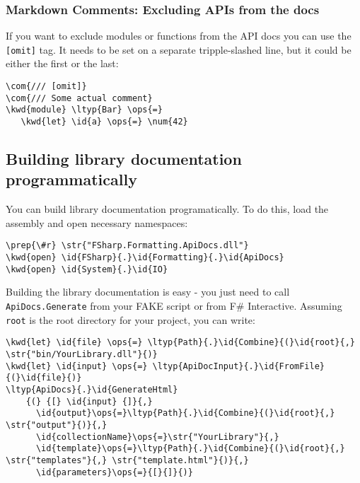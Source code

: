\documentclass{article}
\newcommand{\id}[1]{\textcolor{black}{#1}}
\newcommand{\com}[1]{\textcolor{officegreen}{#1}}
\newcommand{\kwd}[1]{\textcolor{navy}{#1}}
\newcommand{\num}[1]{\textcolor{officegreen}{#1}}
\newcommand{\ops}[1]{\textcolor{purple}{#1}}
\newcommand{\prep}[1]{\textcolor{purple}{#1}}
\newcommand{\str}[1]{\textcolor{olive}{#1}}
\begin{document}
\subsubsection*{Markdown Comments: Excluding APIs from the docs}



If you want to exclude modules or functions from the API docs you can use the \texttt{[omit]} tag.
It needs to be set on a separate tripple-slashed line, but it could be either the first or the last:
\begin{Verbatim}[commandchars=\\\{\}]
\com{/// [omit]}
\com{/// Some actual comment}
\kwd{module} \ltyp{Bar} \ops{=} 
   \kwd{let} \id{a} \ops{=} \num{42}
\end{Verbatim}

\subsection*{Building library documentation programmatically}



You can build library documentation programatically. To do this, load the assembly and open necessary namespaces:
\begin{Verbatim}[commandchars=\\\{\}]
\prep{\#r} \str{"FSharp.Formatting.ApiDocs.dll"}
\kwd{open} \id{FSharp}{.}\id{Formatting}{.}\id{ApiDocs}
\kwd{open} \id{System}{.}\id{IO}
\end{Verbatim}



Building the library documentation is easy - you just need to call
\texttt{ApiDocs.Generate} from your FAKE script or from F\# Interactive.
Assuming \texttt{root} is the root directory for your project, you can write:
\begin{Verbatim}[commandchars=\\\{\}]
\kwd{let} \id{file} \ops{=} \ltyp{Path}{.}\id{Combine}{(}\id{root}{,} \str{"bin/YourLibrary.dll"}{)}
\kwd{let} \id{input} \ops{=} \ltyp{ApiDocInput}{.}\id{FromFile}{(}\id{file}{)} 
\ltyp{ApiDocs}{.}\id{GenerateHtml}
    {(} {[} \id{input} {]}{,} 
      \id{output}\ops{=}\ltyp{Path}{.}\id{Combine}{(}\id{root}{,} \str{"output"}{)}{,}
      \id{collectionName}\ops{=}\str{"YourLibrary"}{,}
      \id{template}\ops{=}\ltyp{Path}{.}\id{Combine}{(}\id{root}{,} \str{"templates"}{,} \str{"template.html"}{)}{,}
      \id{parameters}\ops{=}{[}{]}{)}
\end{Verbatim}
\end{document}
